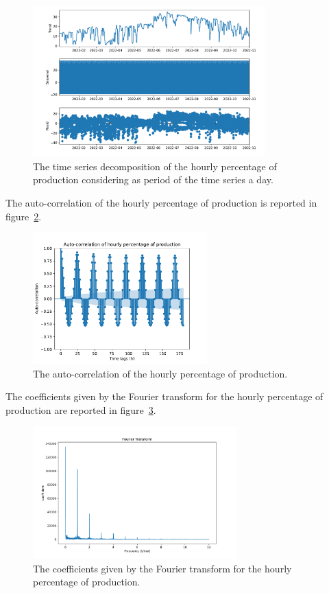 \begin{figure}[H]
\centering
\includegraphics[width=0.8\textwidth]{images/production/hourly_decomposition}
\caption{The time series decomposition of the hourly percentage of production considering as period of the time series a day.}
\label{fig:productiondecomposition}
\end{figure}

The auto-correlation of the hourly percentage of production is reported in figure~\ref{fig:productioncorrelation}. %

\begin{figure}[H]
\centering
\includegraphics[width=0.6\textwidth]{images/production/hourly_correlation_week_range}
\caption{The auto-correlation of the hourly percentage of production.}
\label{fig:productioncorrelation}
\end{figure}

The coefficients given by the Fourier transform for the hourly percentage of production are reported in figure~\ref{fig:productionft}. %

\begin{figure}[H]
\centering
\includegraphics[width=0.7\textwidth]{images/production/ft_hour_day}
\caption{The coefficients given by the Fourier transform for the hourly percentage of production.}
\label{fig:productionft}
\end{figure}

